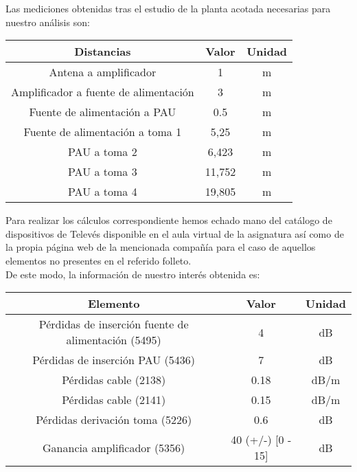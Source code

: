 \documentclass{article}[12 pt]
\begin{document}
		Las mediciones obtenidas tras el estudio de la planta acotada necesarias para nuestro análisis son:

		\vskip 3mm

		\begin{center}
			\begin{tabular}{| c | c | c |}
				\hline
				\textbf{Distancias} & \textbf{Valor} & \textbf{Unidad}\\
				\hline
				Antena a amplificador & 1 & m\\
				\hline
				Amplificador a fuente de alimentación & 3 & m\\
				\hline
				Fuente de alimentación a PAU & 0.5 & m\\
				\hline
				Fuente de alimentación a toma 1 & 5,25 & m\\
				\hline
				PAU a toma 2 & 6,423 & m\\
				\hline
				PAU a toma 3 & 11,752 & m\\
				\hline
				PAU a toma 4  & 19,805 & m\\
				\hline
			\end{tabular}
		\end{center}

		\vskip 3mm

		Para realizar los cálculos correspondiente hemos echado mano del catálogo de dispositivos de Televés disponible en el aula virtual de la asignatura así como de la propia página web de la mencionada compañía para el caso de aquellos elementos no presentes en el referido folleto.\\

		De este modo, la información de nuestro interés obtenida es:

		\vskip 3mm
		\begin{center}
			\begin{tabular}{| c | c | c |}
				\hline
				\textbf{Elemento} & \textbf{Valor} & \textbf{Unidad}\\
				\hline
				Pérdidas de inserción fuente de alimentación (5495) & 4 & dB\\
				\hline
				Pérdidas de inserción PAU (5436) & 7 & dB\\
				\hline
				Pérdidas cable (2138) & 0.18 & dB/m\\
				\hline
				Pérdidas cable (2141) & 0.15 & dB/m\\
				\hline
				Pérdidas derivación toma (5226) & 0.6 & dB\\
				\hline
				Ganancia amplificador (5356) & 40 (+/-) [0 - 15] & dB\\
				\hline
			\end{tabular}
		\end{center}
\end{document}
